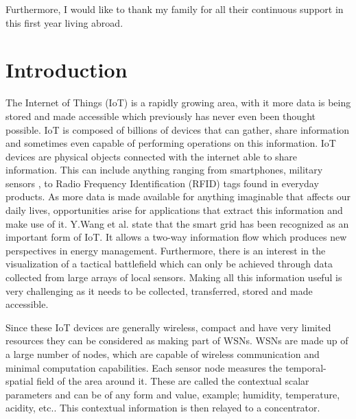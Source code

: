 \documentclass{mproj}
\begin{document}
Furthermore, I would like to thank my family for all their continuous support in this first year living abroad. 


\tableofcontents


\chapter{Introduction}\label{intro}
The Internet of Things (IoT) is a rapidly growing area, with it more data is being stored and made accessible which previously has never even been thought possible. IoT is composed of billions of devices that can gather, share information and sometimes even capable of performing operations on this information. IoT devices are physical objects connected with the internet able to share information. This can include anything ranging from smartphones, military sensors \cite{surveyMilitary}, to Radio Frequency Identification (RFID) tags found in everyday products. As more data is made available for anything imaginable that affects our daily lives, opportunities arise for applications that extract this information and make use of it. Y.Wang et al. \cite{distributedEnergyDistribution} state that the smart grid has been recognized as an important form of IoT. It allows a two-way information flow which produces new perspectives in energy management. Furthermore, there is an interest in the visualization of a tactical battlefield which can only be achieved through data collected from large arrays of local sensors. \cite{SmartSensorWeb} Making all this information useful is very challenging as it needs to be collected, transferred, stored and made accessible. \cite{intelligentContextualInformation}

Since these IoT devices are generally wireless, compact and have very limited resources they can be considered as making part of WSNs. WSNs are made up of a large number of nodes, which are capable of wireless communication and minimal computation capabilities. \cite{adaptiveDataForwarding} Each sensor node measures the temporal-spatial field of the area around it. These are called the contextual scalar parameters and can be of any form and value, example; humidity, temperature, acidity, etc.. This contextual information is then relayed to a concentrator. \cite{adaptiveDataForwarding}
\end{document}
